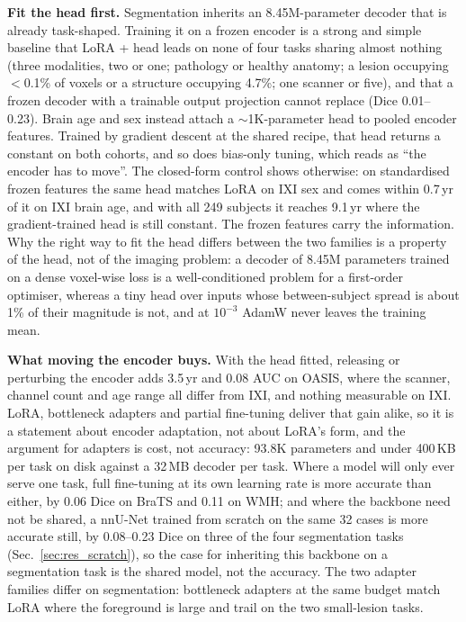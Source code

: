 \iffull\documentclass[journal]{IEEEtran}\else\documentclass[journal,twoside,web]{ieeecolor}\usepackage{generic}\fi
\begin{document}
\textbf{Fit the head first.} Segmentation inherits an 8.45M-parameter decoder that is already task-shaped. Training it on a frozen encoder is a strong and simple baseline that LoRA + head leads on none of four tasks sharing almost nothing (three modalities, two or one; pathology or healthy anatomy; a lesion occupying $<$0.1\% of voxels or a structure occupying 4.7\%; one scanner or five), and that a frozen decoder with a trainable output projection cannot replace (Dice 0.01--0.23). Brain age and sex instead attach a $\sim$1K-parameter head to pooled encoder features. Trained by gradient descent at the shared recipe, that head returns a constant on both cohorts, and so does bias-only tuning, which reads as ``the encoder has to move''. The closed-form control shows otherwise: on standardised frozen features the same head matches LoRA on IXI sex and comes within 0.7\,yr of it on IXI brain age, and with all 249 subjects it reaches 9.1\,yr where the gradient-trained head is still constant. The frozen features carry the information. Why the right way to fit the head differs between the two families is a property of the head, not of the imaging problem: a decoder of 8.45M parameters trained on a dense voxel-wise loss is a well-conditioned problem for a first-order optimiser, whereas a tiny head over inputs whose between-subject spread is about 1\% of their magnitude is not, and at $10^{-3}$ AdamW never leaves the training mean.

\textbf{What moving the encoder buys.} With the head fitted, releasing or perturbing the encoder adds 3.5\,yr and 0.08 AUC on OASIS, where the scanner, channel count and age range all differ from IXI, and nothing measurable on IXI. LoRA, bottleneck adapters and partial fine-tuning deliver that gain alike, so it is a statement about encoder adaptation, not about LoRA's form, and the argument for adapters is cost, not accuracy: 93.8K parameters and under 400\,KB per task on disk against a 32\,MB decoder per task. Where a model will only ever serve one task, full fine-tuning at its own learning rate is more accurate than either, by 0.06 Dice on BraTS and 0.11 on WMH; and where the backbone need not be shared, a nnU-Net trained from scratch on the same 32 cases is more accurate still, by 0.08--0.23 Dice on three of the four segmentation tasks (Sec.~\ref{sec:res_scratch}), so the case for inheriting this backbone on a segmentation task is the shared model, not the accuracy. The two adapter families differ on segmentation: bottleneck adapters at the same budget match LoRA where the foreground is large and trail on the two small-lesion tasks.
\end{document}
